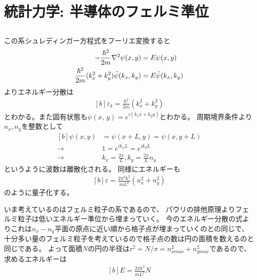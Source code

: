 \documentclass[../../sp_2013.tex]{subfiles}
\begin{document}
\section{統計力学: 半導体のフェルミ準位}
\subsection{}
この系シュレディンガー方程式をフーリエ変換すると
\begin{equation}\begin{aligned}[b]
    -\frac{\hbar^2}{2m}\laplacian\psi(x,y)&=E\psi(x,y)\\
    \frac{\hbar^2}{2m}(k_x^2+k_y^2)\tilde{\psi}(k_x,k_y) &= E \tilde{\psi}(k_x,k_y)
\end{aligned}\end{equation}
よりエネルギー分散は
\begin{equation}\begin{aligned}[b]
    \varepsilon_k = \frac{\hbar^2}{2m}(k_x^2+k_y^2)
\end{aligned}\end{equation}
とわかる。また固有状態も\(\psi(x,\,y)=e^{i(k_xx+k_yy)}\)とわかる。
周期境界条件より\(n_x,n_y\)を整数として
\begin{equation}\begin{aligned}[b]
    \psi(x,y) &= \psi(x+L,y) = \psi(x,y+L)\\
    \rightarrow\quad& 1 = e^{ik_xL} = e^{ik_y L}\\
    \rightarrow\quad& k_x = \frac{2\pi}{L},  k_y = \frac{2\pi}{L}n_y
\end{aligned}\end{equation}
というように波数は離散化される。
同様にエネルギーも
\begin{equation}\begin{aligned}[b]
    \varepsilon = \frac{2\pi^2\hbar^2}{mL^2}(n_x^2+n_y^2)
\end{aligned}\end{equation}
のように量子化する。

いま考えているのはフェルミ粒子の系であるので、
パウリの排他原理よりフェルミ粒子は低いエネルギー準位から埋まっていく。
今のエネルギー分散の式よりこれは\(n_x-n_y\)平面の原点に近い順から格子点が埋まっていくのとの同じで、
十分多い量のフェルミ粒子を考えているので格子点の数は円の面積を数えるのと同じである。
よって面積\(N\)の円の半径は\(r^2 = N/\pi = n_{xmax}^2+n_{ymax}^2\)であるので、求めるエネルギーは
\begin{equation}\begin{aligned}[b]
    E = \frac{2\pi\hbar^2}{mL^2}N
\end{aligned}\end{equation}
\end{document}
